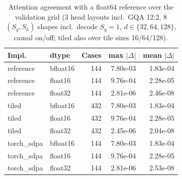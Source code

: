 \begin{table}[t]
\centering
\footnotesize
\caption{Attention agreement with a float64 reference over the validation grid (3 head layouts incl.\ GQA 12:2, 8 $(S_q,S_k)$ shapes incl.\ decode $S_q{=}1$, $d\in\{32,64,128\}$, causal on/off; tiled also over tile sizes 16/64/128).}
\label{tab:attnerr}
\begin{tabular}{llrrr}
\toprule
Impl. & dtype & Cases & max $|\Delta|$ & mean $|\Delta|$ \\
\midrule
reference & bfloat16 & 144 & 7.80e-03 & 1.83e-04 \\
reference & float16 & 144 & 9.76e-04 & 2.28e-05 \\
reference & float32 & 144 & 2.81e-06 & 2.46e-08 \\
tiled & bfloat16 & 432 & 7.80e-03 & 1.83e-04 \\
tiled & float16 & 432 & 9.76e-04 & 2.28e-05 \\
tiled & float32 & 432 & 2.45e-06 & 2.04e-08 \\
torch\_sdpa & bfloat16 & 144 & 7.80e-03 & 1.83e-04 \\
torch\_sdpa & float16 & 144 & 9.76e-04 & 2.28e-05 \\
torch\_sdpa & float32 & 144 & 2.81e-06 & 2.53e-08 \\
\bottomrule
\end{tabular}
\end{table}
